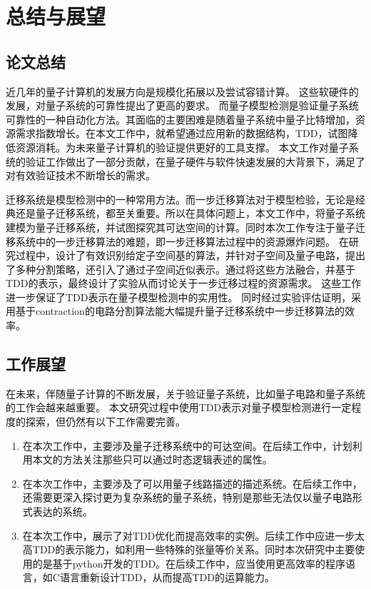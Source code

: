 \chapter{总结与展望}
\section{论文总结}

近几年的量子计算机的发展方向是规模化拓展以及尝试容错计算。
这些软硬件的发展，对量子系统的可靠性提出了更高的要求。
而量子模型检测是验证量子系统可靠性的一种自动化方法。其面临的主要困难是随着量子系统中量子比特增加，资源需求指数增长。在本文工作中，就希望通过应用新的数据结构，TDD，试图降低资源消耗。为未来量子计算机的验证提供更好的工具支撑。
本文工作对量子系统的验证工作做出了一部分贡献，在量子硬件与软件快速发展的大背景下，满足了对有效验证技术不断增长的需求。

迁移系统是模型检测中的一种常用方法。而一步迁移算法对于模型检验，无论是经典还是量子迁移系统，都至关重要。所以在具体问题上，本文工作中，将量子系统建模为量子迁移系统，并试图探究其可达空间的计算。同时本次工作专注于量子迁移系统中的一步迁移算法的难题，即一步迁移算法过程中的资源爆炸问题。
在研究过程中，设计了有效识别给定子空间基的算法，并针对子空间及量子电路，提出了多种分割策略，还引入了通过子空间近似表示。通过将这些方法融合，并基于TDD的表示，最终设计了实验从而讨论关于一步迁移过程的资源需求。
这些工作进一步保证了TDD表示在量子模型检测中的实用性。
同时经过实验评估证明，采用基于contraction的电路分割算法能大幅提升量子迁移系统中一步迁移算法的效率。


\section{工作展望}

在未来，伴随量子计算的不断发展，关于验证量子系统，比如量子电路和量子系统的工作会越来越重要。
本文研究过程中使用TDD表示对量子模型检测进行一定程度的探索，但仍然有以下工作需要完善。
\begin{enumerate}
    \item 在本次工作中，主要涉及量子迁移系统中的可达空间。在后续工作中，计划利用本文的方法关注那些只可以通过时态逻辑表述的属性。
    \item 在本次工作中，主要涉及了可以用量子线路描述的描述系统。在后续工作中，还需要更深入探讨更为复杂系统的量子系统，特别是那些无法仅以量子电路形式表达的系统。
    \item 在本次工作中，展示了对TDD优化而提高效率的实例。后续工作中应进一步太高TDD的表示能力，如利用一些特殊的张量等价关系。同时本次研究中主要使用的是基于python开发的TDD。在后续工作中，应当使用更高效率的程序语言，如C语言重新设计TDD，从而提高TDD的运算能力。
\end{enumerate}

